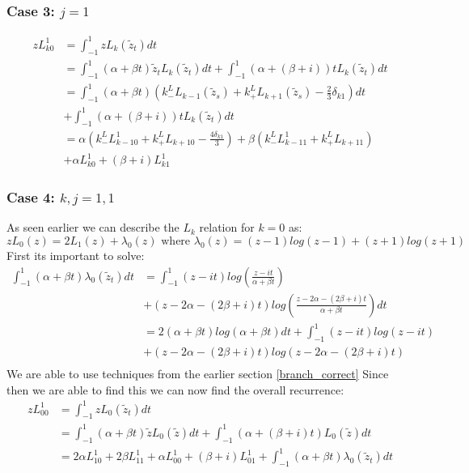\documentclass{article}
\begin{document}
\subsubsection{Case 3: $j=1$}
\begin{align}
    zL_{k0}^1&=\int_{-1}^1zL_k(\tilde z_t)dt\\
    &=\int_{-1}^1(\alpha+\beta t)\tilde z_tL_k(\tilde z_t)dt+\int_{-1}^1(\alpha+(\beta+i))tL_k(\tilde z_t)dt\\
    &=\int_{-1}^1(\alpha+\beta t)(k_-^LL_{k-1}(\tilde z_s)+k_+^LL_{k+1}(\tilde z_s)-\frac{2}{3}\delta_{k1})dt\\
    &+\int_{-1}^1(\alpha+(\beta+i))tL_k(\tilde z_t)dt\\
    &=\alpha(k_-^LL_{k-10}^1+k_+^LL_{k+10}-\frac{4\delta_{k1}}{3})+\beta(k_-^LL_{k-11}^1+k_+^LL_{k+11})\\
    &+\alpha L_{k0}^1+(\beta+i)L_{k1}^1
\end{align}

\subsubsection{Case 4: $k,j=1,1$}
As seen earlier we can describe the $L_k$ relation for $k=0$ as:
$$zL_0(z)=2L_1(z)+\lambda_0(z)\text{ where } \lambda_0(z)=(z-1)log(z-1)+(z+1)log(z+1)$$
First its important to solve:
\begin{align}
    \int_{-1}^1(\alpha+\beta t)\lambda_0(\tilde z_t)dt&=\int_{-1}^1(z-it)log(\frac{z-it}{\alpha+\beta t})\\
    &+(z-2\alpha-(2\beta+i)t)log(\frac{z-2\alpha-(2\beta+i)t}{\alpha+\beta t})dt\\
    &=2(\alpha+\beta t)log(\alpha+\beta t)dt+\int_{-1}^1(z-it)log(z-it)\\
    &+(z-2\alpha-(2\beta+i)t)log(z-2\alpha-(2\beta+i)t)\\
\end{align}
We are able to use techniques from the earlier section \eqref{branch_correct}
Since then we are able to find this we can now find the overall recurrence:
\begin{align}
    zL_{00}^1&=\int_{-1}^1zL_0(\tilde z_t)dt\\
    &=\int_{-1}^1(\alpha+\beta t)\tilde zL_0(\tilde z)dt+\int_{-1}^1(\alpha+(\beta+i)t)L_0(\tilde z)dt\\
    &=2\alpha L_{10}^1+2\beta L_{11}^1+\alpha L_{00}^1+(\beta+i)L_{01}^1+\int_{-1}^1(\alpha+\beta t)\lambda_0(\tilde z_t)dt
\end{align}
\end{document}
